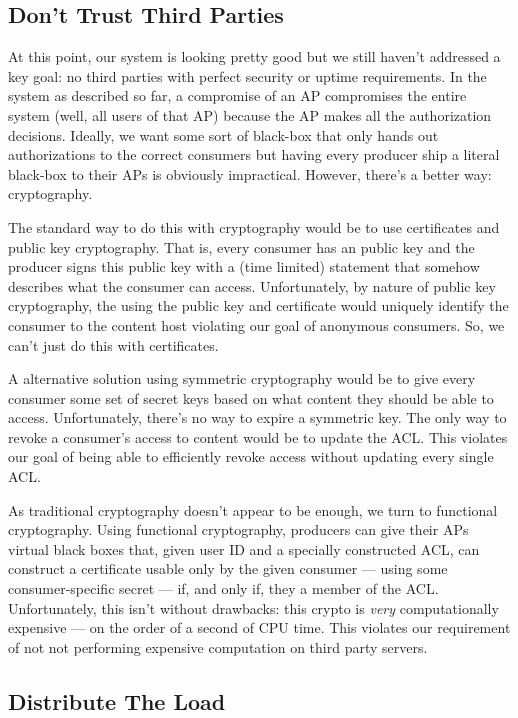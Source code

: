 \documentclass[pdftex,12pt,a4papaer,twoside,notitlepage]{report}
\begin{document}
\subsection{Don't Trust Third Parties}

At this point, our system is looking pretty good but we still haven't addressed
a key goal: no third parties with perfect security or uptime requirements. In
the system as described so far, a compromise of an AP compromises the entire
system (well, all users of that AP) because the AP makes all the authorization
decisions. Ideally, we want some sort of black-box that only hands out
authorizations to the correct consumers but having every producer ship a
literal black-box to their APs is obviously impractical. However, there's a
better way: cryptography.

The standard way to do this with cryptography would be to use certificates and
public key cryptography. That is, every consumer has an public key and the
producer signs this public key with a (time limited) statement that somehow
describes what the consumer can access. Unfortunately, by nature of public key
cryptography, the using the public key and certificate would uniquely identify
the consumer to the content host violating our goal of anonymous consumers. So,
we can't just do this with certificates.

A alternative solution using symmetric cryptography would be to give every
consumer some set of secret keys based on what content they should be able to
access. Unfortunately, there's no way to expire a symmetric key. The only way to
revoke a consumer's access to content would be to update the ACL. This violates
our goal of being able to efficiently revoke access without updating every
single ACL.

As traditional cryptography doesn't appear to be enough, we turn to functional
cryptography. Using functional cryptography, producers can give their APs
virtual black boxes that, given user ID and a specially constructed ACL, can
construct a certificate usable only by the given consumer --- using some
consumer-specific secret --- if, and only if, they a member of the ACL.
Unfortunately, this isn't without drawbacks: this crypto is \emph{very}
computationally expensive --- on the order of a second of CPU time. This
violates our requirement of not not performing expensive computation on third
party servers.

\subsection{Distribute The Load}
\end{document}
